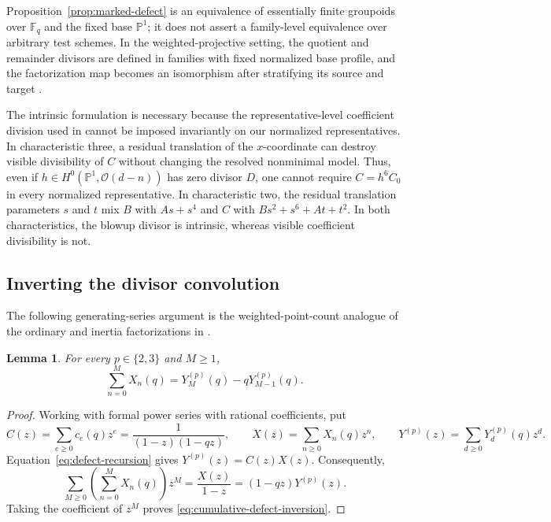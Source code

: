 \documentclass[a4paper,12pt]{amsart}
\newtheorem{lem}[thm]{Lemma}
\theoremstyle{definition}
\newcommand{\Fb}{\mathbb{F}}
\newcommand{\Pb}{\mathbb{P}}
\begin{document}
Proposition~\ref{prop:marked-defect} is an equivalence of essentially finite groupoids over $\Fb_q$ and the fixed base $\Pb^1$; it does not assert a family-level equivalence over arbitrary test schemes.  In the weighted-projective setting, the quotient and remainder divisors are defined in families with fixed normalized base profile, and the factorization map becomes an isomorphism after stratifying its source and target \cite[Lemma~4.32, Proposition~6.1, and Corollary~6.2]{BPS}.

The intrinsic formulation is necessary because the representative-level coefficient division used in \cite[Proposition~6.1]{BPS} cannot be imposed invariantly on our normalized representatives.  In characteristic three, a residual translation of the $x$-coordinate can destroy visible divisibility of $C$ without changing the resolved nonminimal model.  Thus, even if $h\in H^0(\Pb^1,\mathcal O(d-n))$ has zero divisor $D$, one cannot require $C=h^6C_0$ in every normalized representative.  In characteristic two, the residual translation parameters $s$ and $t$ mix $B$ with $As+s^4$ and $C$ with $Bs^2+s^6+At+t^2$.  In both characteristics, the blowup divisor is intrinsic, whereas visible coefficient divisibility is not.

\subsection{Inverting the divisor convolution}

The following generating-series argument is the weighted-point-count analogue of the ordinary and inertia factorizations in \cite[Lemma~8.6, equations~(6)--(7)]{BPS}.

\begin{lem}
\label{lem:defect-inversion}
For every $p\in\{2,3\}$ and $M\geq1$,
\begin{equation}
\label{eq:cumulative-defect-inversion}
\sum_{n=0}^{M}X_n(q)
=
Y_M^{(p)}(q)-qY_{M-1}^{(p)}(q).
\end{equation}
\end{lem}

\begin{proof}
Working with formal power series with rational coefficients, put
\[
C(z)=\sum_{e\geq0}c_e(q)z^e=\frac{1}{(1-z)(1-qz)},
\qquad
X(z)=\sum_{n\geq0}X_n(q)z^n,
\qquad
Y^{(p)}(z)=\sum_{d\geq0}Y_d^{(p)}(q)z^d.
\]
Equation~\eqref{eq:defect-recursion} gives $Y^{(p)}(z)=C(z)X(z)$.  Consequently,
\[
\sum_{M\geq0}\left(\sum_{n=0}^{M}X_n(q)\right)z^M
=
\frac{X(z)}{1-z}
=
(1-qz)Y^{(p)}(z).
\]
Taking the coefficient of $z^M$ proves \eqref{eq:cumulative-defect-inversion}.
\end{proof}
\end{document}
